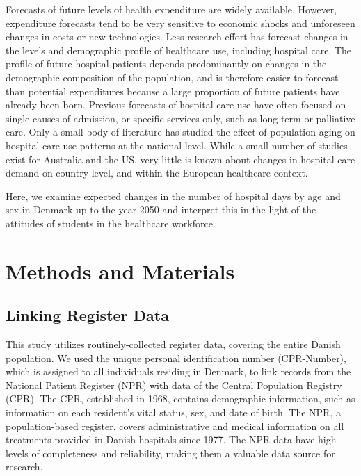 Forecasts of future levels of health expenditure are widely available. However, 
expenditure forecasts tend to be very sensitive to economic shocks and unforeseen 
changes in costs or new technologies.\citep{howdon2018health,breyer2010ageing} 
Less research effort has forecast changes in the levels and demographic profile 
of healthcare use, including hospital care. The profile of future hospital 
patients depends predominantly on changes in the demographic composition of the 
population, and is therefore easier to forecast than potential expenditures because 
a large proportion of future patients have already been born.\citep{dall2013aging} 
Previous forecasts of hospital care use have often focused on single causes of 
admission,\citep{vogl2016informing} or specific services only, such as long-term 
or palliative care.\citep{etkind2017many} Only a small body of literature has studied 
the effect of population aging on hospital care use patterns at the national level. 
While a small number of studies exist for Australia and the US,\citep{schofield2006demographic,
strunk2006effect} very little is known about changes in hospital care demand on 
country-level, and within the European healthcare context.

Here, we examine expected changes in the number of hospital days by age and sex 
in Denmark up to the year 2050 and interpret this in the light of the attitudes 
of students in the healthcare workforce.\\



\section{Methods and Materials}

\subsection{Linking Register Data}

This study utilizes routinely-collected register data, covering the entire 
Danish population. We used the unique personal identiﬁcation number (CPR-Number), 
which is assigned to all individuals residing in Denmark, to link records from 
the National Patient Register (NPR) with data of the Central Population Registry 
(CPR). The CPR, established in 1968, contains demographic information, such as 
information on each resident's vital status, sex, and date of birth.\citep{pedersen2011} 
The NPR, a population-based register, covers administrative and medical information 
on all treatments provided in Danish hospitals since 1977.\citep{schmidt2015danish} 
The NPR data have high levels of completeness and reliability, making them 
a valuable data source for research.\citep{schmidt2015danish} \\

